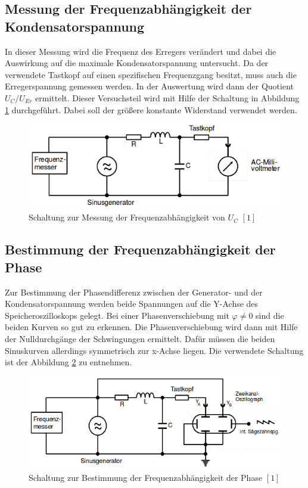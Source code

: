 \documentclass[11pt,ngerman,a4paper]{article}
\begin{document}
\subsection{Messung der Frequenzabhängigkeit der Kondensatorspannung}
In dieser Messung wird die Frequenz des Erregers verändert und dabei die Auswirkung auf die maximale Kondensatorspannung untersucht. Da der verwendete Tastkopf auf einen spezifischen Frequenzgang besitzt, muss auch die Erregerspannung gemessen werden. In der Auswertung wird dann der Quotient $U_C / U_{Er}$ ermittelt.
Dieser Versuchsteil wird mit Hilfe der Schaltung in Abbildung \ref{S2} durchgeführt. Dabei soll der größere konstante Widerstand verwendet werden.
\begin{figure}[h]
\centering
\includegraphics[scale=0.7]{Aufbau2.png}
\caption{Schaltung zur Messung der Frequenzabhängigkeit von $U_C$ $[1]$}
\label{S2}
\end{figure}
\subsection{Bestimmung der Frequenzabhängigkeit der Phase}
Zur Bestimmung der Phasendifferenz zwischen der Generator- und der Kondensatorspannung werden beide Spannungen auf die Y-Achse des Speicheroszilloskops gelegt. Bei einer Phasenverschiebung mit $\varphi \neq 0$ sind die beiden Kurven so gut zu erkennen. Die Phasenverschiebung wird dann mit Hilfe der Nulldurchgänge der Schwingungen ermittelt. Dafür müssen die beiden Sinuskurven allerdings symmetrisch zur x-Achse liegen. Die verwendete Schaltung ist der Abbildung \ref{S3} zu entnehmen.
\begin{figure}[h]
\centering
\includegraphics[scale=0.7]{Aufbau3.png}
\caption{Schaltung zur Bestimmung der Frequenzabhängigkeit der Phase $[1]$}
\label{S3}
\end{figure}
\end{document}
